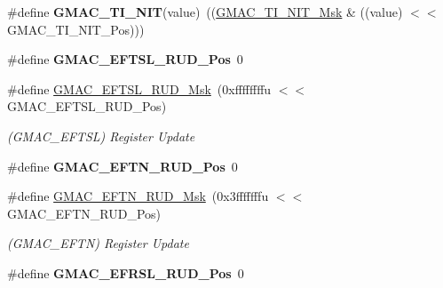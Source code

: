 \begin{DoxyCompactItemize}
\mbox{\label{group__SAME70__GMAC_ga900207cb66a0f45e7cee6378510e01c5}} 
\#define {\bfseries G\+M\+A\+C\+\_\+\+T\+I\+\_\+\+N\+IT}(value)~((\mbox{\hyperlink{group__SAMV71__GMAC_ga1c6cb02b42ee579c5ca8228e382a5414}{G\+M\+A\+C\+\_\+\+T\+I\+\_\+\+N\+I\+T\+\_\+\+Msk}} \& ((value) $<$$<$ G\+M\+A\+C\+\_\+\+T\+I\+\_\+\+N\+I\+T\+\_\+\+Pos)))
\item 
\mbox{\label{group__SAME70__GMAC_gabb2388cb0f5dd1fdb47d1de6572b5732}} 
\#define {\bfseries G\+M\+A\+C\+\_\+\+E\+F\+T\+S\+L\+\_\+\+R\+U\+D\+\_\+\+Pos}~0
\item 
\mbox{\label{group__SAME70__GMAC_ga74df29256ff3a7f4146f5db5032814b8}} 
\#define \mbox{\hyperlink{group__SAME70__GMAC_ga74df29256ff3a7f4146f5db5032814b8}{G\+M\+A\+C\+\_\+\+E\+F\+T\+S\+L\+\_\+\+R\+U\+D\+\_\+\+Msk}}~(0xffffffffu $<$$<$ G\+M\+A\+C\+\_\+\+E\+F\+T\+S\+L\+\_\+\+R\+U\+D\+\_\+\+Pos)
\begin{DoxyCompactList}\small\item\em (G\+M\+A\+C\+\_\+\+E\+F\+T\+SL) Register Update \end{DoxyCompactList}\item 
\mbox{\label{group__SAME70__GMAC_gad2d0d119d6fc27f3015be0e111ee869f}} 
\#define {\bfseries G\+M\+A\+C\+\_\+\+E\+F\+T\+N\+\_\+\+R\+U\+D\+\_\+\+Pos}~0
\item 
\mbox{\label{group__SAME70__GMAC_ga3ce32a9128a544e613a13ab6163f6f8d}} 
\#define \mbox{\hyperlink{group__SAME70__GMAC_ga3ce32a9128a544e613a13ab6163f6f8d}{G\+M\+A\+C\+\_\+\+E\+F\+T\+N\+\_\+\+R\+U\+D\+\_\+\+Msk}}~(0x3fffffffu $<$$<$ G\+M\+A\+C\+\_\+\+E\+F\+T\+N\+\_\+\+R\+U\+D\+\_\+\+Pos)
\begin{DoxyCompactList}\small\item\em (G\+M\+A\+C\+\_\+\+E\+F\+TN) Register Update \end{DoxyCompactList}\item 
\mbox{\label{group__SAME70__GMAC_ga1bb65829e6d4aefdfa2bb3b74c096d9d}} 
\#define {\bfseries G\+M\+A\+C\+\_\+\+E\+F\+R\+S\+L\+\_\+\+R\+U\+D\+\_\+\+Pos}~0
\item 
\mbox{\label{group__SAME70__GMAC_ga6fbc22fb24a4349adabd59d69be72df3}} 
$$
\end{DoxyCompactItemize}
